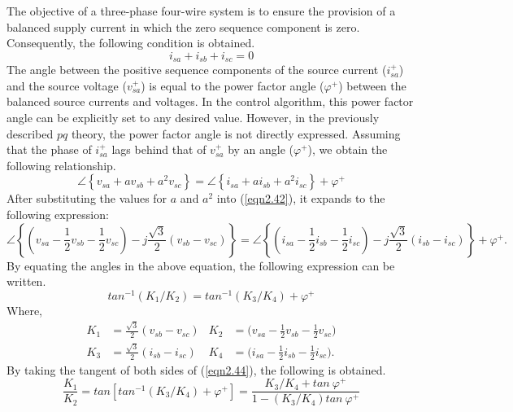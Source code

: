 The objective of a three-phase four-wire system is to ensure the provision of a balanced supply current in which the zero sequence component is zero. Consequently, the following condition is obtained.
\begin{equation}
i_{sa}+i_{sb}+i_{sc}=0
\label{eqn2.41}
\end{equation}
The angle between the positive sequence components of the source current ($i^+_{sa}$) and the source voltage ($v^+_{sa}$) is equal to the power factor angle ($\varphi^+$) between the balanced source currents and voltages. In the control algorithm, this power factor angle can be explicitly set to any desired value. However, in the previously described $pq$ theory, the power factor angle is not directly expressed. Assuming that the phase of $i^+_{sa}$ lags behind that of $v^+_{sa}$ by an angle ($\varphi^+$), we obtain the following relationship.
\begin{equation}
\angle {\left\{v_{sa}+av_{sb}+a^2v_{sc}\right\}} = \angle {\left\{i_{sa}+ai_{sb}+a^2i_{sc}\right\}}+ \varphi^+
\label{eqn2.42}
\end{equation}
After substituting the values for $a$ and $a^2$ into (\ref{eqn2.42}), it expands to the following expression:
\begin{equation}
\angle \left\{ (v_{sa}-\frac{1}{2}v_{sb}- \frac{1}{2}v_{sc}) - j\frac{\sqrt{3}}{2} (v_{sb}-v_{sc}) \right\} = \angle \left\{ (i_{sa}-\frac{1}{2}i_{sb}- \frac{1}{2}i_{sc}) - j\frac{\sqrt{3}}{2} (i_{sb}-i_{sc}) \right\}+ \varphi^+.
\label{eqn2.43}
\end{equation}
By equating the angles in the above equation, the following expression can be written.
\begin{equation}
tan^{-1}(K_1/K_2) = tan^{-1}(K_3/K_4)+\varphi^+
\label{eqn2.44}
\end{equation}
Where,
\begin{align*}
K_1 &= \frac{\sqrt{3}}{2} (v_{sb}-v_{sc})& 
 K_2 & = \Big(v_{sa}-\frac{1}{2}v_{sb}- \frac{1}{2}v_{sc}\Big) \\
  K_3 & = \frac{\sqrt{3}}{2} (i_{sb}-i_{sc}) & 
  K_4 &= \Big(i_{sa}-\frac{1}{2}i_{sb}- \frac{1}{2}i_{sc}\Big).
\label{eqn2.44a}
\end{align*}
By taking the tangent of both sides of (\ref{eqn2.44}), the following is obtained.
\begin{equation}
\frac{K_1}{K_2} = tan\left[tan ^{-1}(K_3/K_4) + \varphi^+ \right] = \frac{K_3/K_4 + tan \: \varphi^+ }{1- (K_3/K_4)tan \: \varphi^+}
\label{eqn2.45}
\end{equation}
